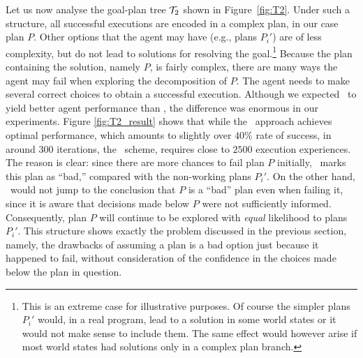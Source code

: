 Let us now analyse the goal-plan tree ${\mathcal{T}}_2$ shown in Figure~\ref{fig:T2}.
Under such a structure, all successful executions are encoded in a complex plan, in our
case plan $P$. Other options that the agent may have (e.g., plans $P_i'$) are of
less complexity, but do not lead to solutions for resolving the
goal.\footnote{This is an extreme case for illustrative purposes. Of
course the simpler plans $P_i'$ would, in a real program, lead to a
solution in some world states or it would not make sense to include
them. The same effect would however arise if most world states had
solutions only in a complex plan branch.}
Because the plan containing the solution, namely $P$, is fairly
complex, there are many ways the agent may fail when exploring the
decomposition of $P$. The agent needs to make several correct choices to
obtain a successful execution.
Although we expected \BUL\ to yield better agent performance than \CL, the
difference was enormous in our experiments. Figure \ref{fig:T2_result} shows that
while the \BUL\ approach achieves optimal performance, which amounts to slightly
over $40\%$ rate of success, in around $300$ iterations, the \CL\ scheme,
requires close to $2500$ execution experiences. The reason is clear: since there
are more chances to fail plan $P$ initially, \CL\ marks this plan as ``bad,''
compared with the non-working plans $P_i'$. On the other hand, \BUL\ would not
jump to the conclusion that $P$ is a ``bad'' plan even when failing it, since it
is aware that decisions made below $P$ were not sufficiently informed. Consequently,
plan $P$ will continue to be explored with \emph{equal} likelihood to plans
$P_i'$.
This structure shows exactly the problem discussed in the previous
section, namely, the drawbacks of assuming a plan is a bad option just because it
happened to fail, without consideration of the confidence in the choices
made below the plan in question.


